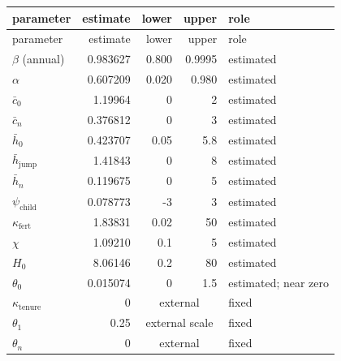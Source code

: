 \documentclass[10pt]{article}
\begin{document}
\begin{longtable}{lrrrl}
\toprule
parameter & estimate & lower & upper & role \\
\midrule
\endfirsthead
\toprule
parameter & estimate & lower & upper & role \\
\midrule
\endhead
$\beta$ (annual) & 0.983627 & 0.800 & 0.9995 & estimated \\
$\alpha$ & 0.607209 & 0.020 & 0.980 & estimated \\
$\bar c_0$ & 1.19964 & 0 & 2 & estimated \\
$\bar c_n$ & 0.376812 & 0 & 3 & estimated \\
$\bar h_0$ & 0.423707 & 0.05 & 5.8 & estimated \\
$\bar h_{\mathrm{jump}}$ & 1.41843 & 0 & 8 & estimated \\
$\bar h_n$ & 0.119675 & 0 & 5 & estimated \\
$\psi_{\mathrm{child}}$ & 0.078773 & -3 & 3 & estimated \\
$\kappa_{\mathrm{fert}}$ & 1.83831 & 0.02 & 50 & estimated \\
$\chi$ & 1.09210 & 0.1 & 5 & estimated \\
$H_0$ & 8.06146 & 0.2 & 80 & estimated \\
$\theta_0$ & 0.015074 & 0 & 1.5 & estimated; near zero \\
$\kappa_{\mathrm{tenure}}$ & 0 & \multicolumn{2}{c}{external} & fixed \\
$\theta_1$ & 0.25 & \multicolumn{2}{c}{external scale} & fixed \\
$\theta_n$ & 0 & \multicolumn{2}{c}{external} & fixed \\
\bottomrule
\end{longtable}
\end{document}
